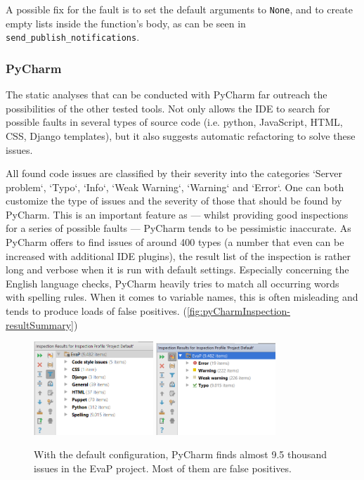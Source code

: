 A possible fix for the fault is to set the default arguments to \texttt{None}, and to create empty lists inside the function's body, as can be seen in \texttt{send\_publish\_notifications}.

\subsubsection{PyCharm}
The static analyses that can be conducted with PyCharm far outreach the possibilities of the other tested tools.
Not only allows the IDE to search for possible faults in several types of source code (i.e. python, JavaScript, HTML, CSS, Django templates), but it also suggests automatic refactoring to solve these issues.

All found code issues are classified by their severity into the categories `Server problem`, `Typo`, `Info`, `Weak Warning`, `Warning` and `Error`.
One can both customize the type of issues and the severity of those that should be found by PyCharm.
This is an important feature as --- whilst providing good inspections for a series of possible faults --- PyCharm tends to be pessimistic inaccurate.
As PyCharm offers to find issues of around 400 types (a number that even can be increased with additional IDE plugins), the result list of the inspection is rather long and verbose when it is run with default settings.
Especially concerning the English language checks, PyCharm heavily tries to match all occurring words with spelling rules.
When it comes to variable names, this is often misleading and tends to produce loads of false positives. (\autoref{fig:pyCharmInspection-resultSummary})

\begin{figure}[h]
	\centering
	\includegraphics[width=0.4\textwidth]{graphics/pyCharmInspection-resultSummary}
	\includegraphics[width=0.4\textwidth]{graphics/pyCharmInspection-resultSummaryClassification}
	\caption{With the default configuration, PyCharm finds almost 9.5 thousand issues in the EvaP project. Most of them are false positives.}
	\label{fig:pyCharmInspection-resultSummary}
\end{figure}


